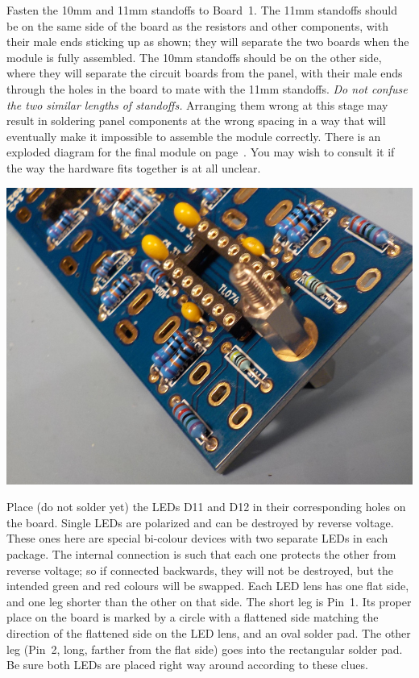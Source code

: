 Fasten the 10mm and 11mm standoffs to Board~1.  The 11mm standoffs
should be on the same side of the board as the resistors and other
components, with their male ends sticking up as shown; they will separate
the two boards when the module is fully assembled.  The 10mm standoffs
should be on the other side, where they will separate the circuit boards
from the panel, with their male ends through the holes in the board to mate
with the 11mm standoffs.  \emph{Do not confuse the two similar lengths of
standoffs.}  Arranging them wrong at this stage may result in soldering panel
components at the wrong spacing in a way that will eventually make it
impossible to assemble the module correctly.
There is an exploded diagram for the final module on
page~\pageref{fig:exploded}.  You may wish to consult it if the way the
hardware fits together is at all unclear.

\noindent\includegraphics[width=\linewidth]{standoffs.jpg}

\pagebreak

Place (do not solder yet) the LEDs D11 and D12 in their corresponding holes
on the board.  Single LEDs are polarized and can be destroyed by reverse
voltage.  These ones here are special bi-colour devices with two separate
LEDs in each package.  The internal connection is such that each one
protects the other from reverse voltage; so if connected backwards, they
will not be destroyed, but the intended green and red colours will be
swapped.  Each LED lens has one flat side, and one leg shorter than the
other on that side.  The short leg is Pin~1.  Its proper place on the board
is marked by a circle with a flattened side matching the direction of the
flattened side on the LED lens, and an oval solder pad.  The other leg
(Pin~2, long, farther from the flat side) goes into the rectangular solder
pad.  Be sure both LEDs are placed right way around according to these
clues.

